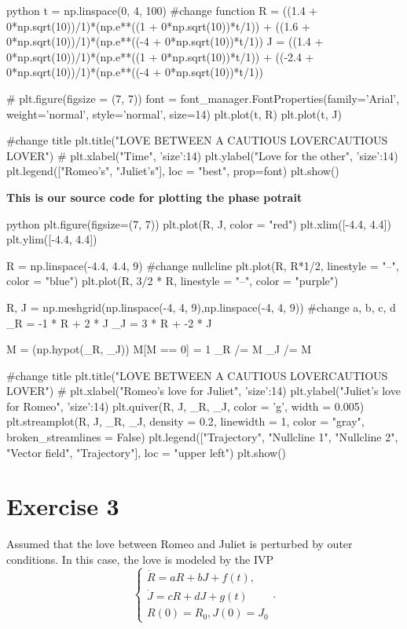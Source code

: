 \documentclass[a4paper]{article}
\begin{document}
\begin{code}{python}
t = np.linspace(0, 4, 100)
#change function
R = ((1.4 + 0*np.sqrt(10))/1)*(np.e**((1 + 0*np.sqrt(10))*t/1)) + ((1.6 + 0*np.sqrt(10))/1)*(np.e**((-4 + 0*np.sqrt(10))*t/1))
J = ((1.4 + 0*np.sqrt(10))/1)*(np.e**((1 + 0*np.sqrt(10))*t/1)) + ((-2.4 + 0*np.sqrt(10))/1)*(np.e**((-4 + 0*np.sqrt(10))*t/1))

#
plt.figure(figsize = (7, 7))
font = font_manager.FontProperties(family='Arial',
                                   weight='normal',
                                   style='normal', size=14)
plt.plot(t, R)
plt.plot(t, J)

#change title
plt.title("LOVE BETWEEN A CAUTIOUS LOVER\nAND CAUTIOUS LOVER")
#
plt.xlabel("Time", {'size':14})
plt.ylabel("Love for the other", {'size':14})
plt.legend(["Romeo's", "Juliet's"], loc = "best", prop=font)
plt.show()
\end{code}
\textbf{This is our source code for plotting the phase potrait}
\begin{code}{python}
plt.figure(figsize=(7, 7))
plt.plot(R, J, color = "red")
plt.xlim([-4.4, 4.4])
plt.ylim([-4.4, 4.4])

R = np.linspace(-4.4, 4.4, 9)
#change nullcline
plt.plot(R, R*1/2, linestyle = "--", color = "blue")
plt.plot(R,  3/2 * R, linestyle = "--", color = "purple")

R, J = np.meshgrid(np.linspace(-4, 4, 9),np.linspace(-4, 4, 9))
#change a, b, c, d
_R = -1 * R + 2 * J
_J = 3 * R + -2 * J

M = (np.hypot(_R, _J))
M[M == 0] = 1
_R /= M
_J /= M

#change title
plt.title("LOVE BETWEEN A CAUTIOUS LOVER\nAND CAUTIOUS LOVER")
#
plt.xlabel("Romeo's love for Juliet", {'size':14})
plt.ylabel("Juliet's love for Romeo", {'size':14})
plt.quiver(R, J, _R, _J, color = 'g', width = 0.005)
plt.streamplot(R, J, _R, _J, density = 0.2, linewidth = 1, color = "gray", broken_streamlines = False)
plt.legend(["Trajectory", "Nullcline 1", "Nullcline 2", "Vector field", "Trajectory"], loc = "upper left")
plt.show()
\end{code}



\section{Exercise 3}
Assumed that the love between Romeo and Juliet is perturbed by outer conditions. In this case, the love is modeled by the IVP
$$
\left\{\begin{array}{l}
	\dot{R}=a R+b J+f(t), \\
	\dot{J}=c R+d J+g(t) \\
	R(0)=R_{0}, J(0)=J_{0}
\end{array} .\right.
$$
\end{document}
